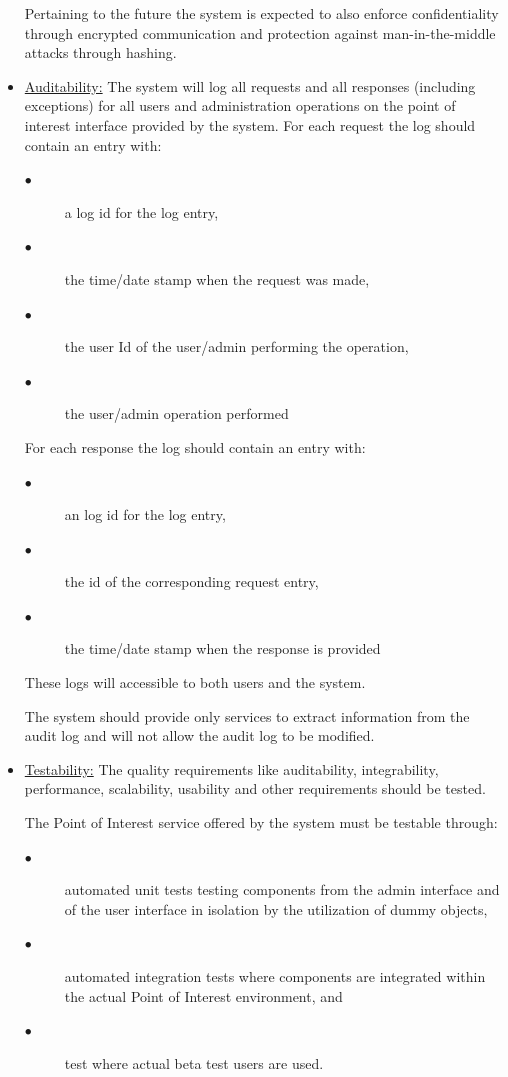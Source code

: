 \documentclass[runningheads,a4paper]{article}
\begin{document}
\begin{itemize}
Pertaining to the future the system is expected to also enforce confidentiality through encrypted communication and protection against man-in-the-middle attacks through hashing.

\item \underline {Auditability:}
The system will log all requests and all responses (including exceptions) for all users and administration operations on the point of interest interface provided by the system.
For each request the log should contain an entry with:
\begin{description}
\item[$\bullet$] a log id for the log entry,
\item[$\bullet$] the time/date stamp when the request was made,
\item[$\bullet$] the user Id of the user/admin performing the operation,
\item[$\bullet$] the user/admin operation performed 
\end{description}

For each response the log should contain an entry with:
\begin{description}
\item[$\bullet$] an log id for the log entry,
\item[$\bullet$] the id of the corresponding request entry,
\item[$\bullet$] the time/date stamp when the response is provided
\end{description}
These logs will accessible to both users and the system.

The system should provide only services to extract information from the audit log and will not
allow the audit log to be modified.

\item \underline {Testability:}
The quality requirements like auditability, integrability, performance, scalability, usability and other requirements should be tested.

The Point of Interest service offered by the system must be testable through:
\begin{description}
\item[$\bullet$] automated unit tests testing components from the admin interface and of the user interface in isolation by the utilization of dummy objects, 
\item[$\bullet$] automated integration tests where components are integrated within the actual Point of Interest environment, and
\item[$\bullet$] test where actual beta test users are used. 
\end{description}


\end{itemize}
\end{document}
